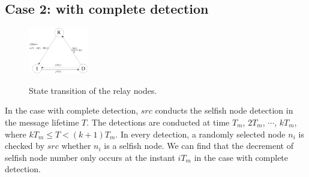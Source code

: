 \subsection{Case 2: with complete detection}
\label{subsec:full_detc}
\begin{figure}
  \centering
  {\includegraphics[width=0.23\textwidth]
  {fig/state_transition_detect.eps}}
     \caption{State transition of the relay nodes.}
     \label{fig:ss_dt}
\end{figure}
In the case with complete detection,
$src$ conducts the selfish node detection
in the message lifetime $T$.
The detections are conducted at
time {$T_{m}$, $2 T_{m}$, $\cdots$, $k T_{m}$},
where $k T_{m} \le T < (k+1) T_{m}$.
In every detection, a randomly selected node $n_{i}$
is checked by $src$ whether $n_{i}$ is a selfish node.
We can find that the decrement of selfish node number
only occurs at the instant $iT_{m}$
in the case with complete detection.


